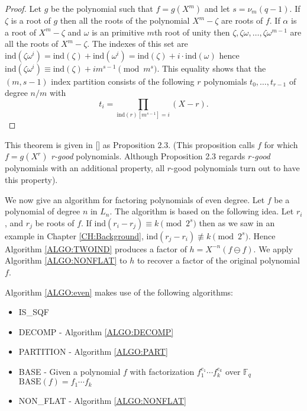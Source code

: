 \documentclass{article}
\theoremstyle{plain}
\theoremstyle{definition}
\def\Fq {{ \mathbb{F} _ {q} }}
\def\ind {{ \mathrm{ind} }}
\begin{document}
	  \begin{proof}
	      Let $g$ be the polynomial such that $f=g(X^m)$ and let $s=\nu_m(q-1)$. If $\zeta$ is a root of $g$	then all the roots of the polynomial $X^m-\zeta$ are roots of $f$. If $\alpha$ is a root of $X^m-\zeta$ and $\omega$ is an primitive $m$th root of unity then $\zeta,\zeta\omega,\ldots, \zeta\omega^{m-1}$ are all the roots of $X^m-\zeta$. The indexes of this set are $\ind(\zeta\omega^{i})=\ind(\zeta)+\ind(\omega^i)=\ind(\zeta)+i \cdot \ind(\omega)$ hence $\ind(\zeta\omega^{i})  \equiv \ind(\zeta) + im^{s-1} \pmod{m^s}$. This equality shows that the $(m,s-1)$ index partition consists of the following $r$ polynomials $t_0,\ldots,t_{r-1}$ of degree $n/m$ with		
				\[   t_i = \prod_{\ind(r)[m^{s-1}]=i}{(X-r)}.   \]
		\end{proof}
		
		This theorem is given in [] as Proposition 2.3. (This proposition calls $f$ for which $f=g(X^r)$ \emph{r-good} polynomials. Although Proposition 2.3 regards \emph{$r$-good} polynomials with an additional property, all $r$-good polynomials turn out to have this property). 
						
				
		We now give an algorithm for factoring polynomials of even degree. Let $f$ be a polynomial of degree $n$ in $L_n$. The algorithm is based on the following idea. Let $r_i$, and $r_j$ be roots of $f$. If $\ind(r_i-r_j) \equiv k \pmod {2^s}$ then as we saw in an example in Chapter \ref{CH:Background}, $\ind(r_j-r_i) \not\equiv k \pmod {2^s}$. Hence Algorithm \ref{ALGO:TWOIND} produces a factor of $h=X^{-n}(f \ominus f)$. We apply Algorithm \ref{ALGO:NONFLAT} to $h$ to recover a factor of the original polynomial $f$.\hspace*{\fill}
			
		Algorithm \ref{ALGO:even} makes use of the following algorithms:
		\begin{itemize}
		\item IS\_SQF                                    
		\item DECOMP - Algorithm \ref{ALGO:DECOMP}       
    \item PARTITION - Algorithm \ref{ALGO:PART}      
		\item BASE - Given a polynomial $f$ with factorization $f_1^{e_1} \cdots  f_k^{e_k}$ over $\Fq$ $\textrm{BASE}(f)=f_1 \cdots f_k$                               
		\item NON\_FLAT - Algorithm \ref{ALGO:NONFLAT}
		\end{itemize}
		
\end{document}
